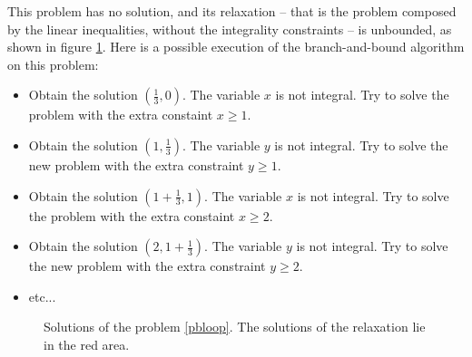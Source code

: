 \documentclass{article}
\begin{document}
This problem has no solution, and its relaxation -- that is the problem
composed by the linear inequalities, without the integrality constraints -- is
unbounded, as shown in figure \ref{bbloop}. Here is a possible execution of the
branch-and-bound algorithm on this problem:
\begin{itemize}
  \item Obtain the solution $(\frac{1}{3}, 0)$. The variable $x$ is not
    integral. Try to solve the problem with the extra constaint
    $x \geqslant 1$.
  \item Obtain the solution $(1, \frac{1}{3})$. The variable $y$ is not
    integral. Try to solve the new problem with the extra constraint $y
    \geqslant 1$.
  \item Obtain the solution $(1 + \frac{1}{3}, 1)$. The variable $x$ is not
    integral. Try to solve the problem with the extra constaint
    $x \geqslant 2$.
  \item Obtain the solution $(2, 1 + \frac{1}{3})$. The variable $y$ is not
    integral. Try to solve the new problem with the extra constraint $y
    \geqslant 2$.
  \item etc...
\end{itemize}


\begin{figure}[h]
  \centering


  \label{bbloop}
  \caption{Solutions of the problem
           \ref{pbloop}. The solutions of the relaxation lie in the red area.}
\end{figure}
\end{document}
